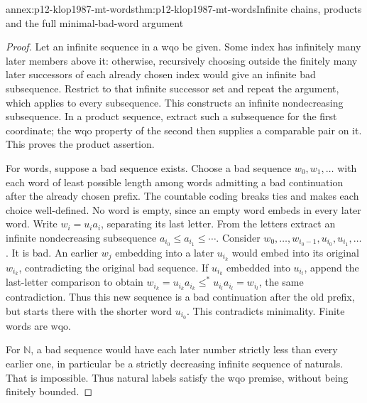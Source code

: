 \begin{annexitem}{annex:p12-klop1987-mt-words}{thm:p12-klop1987-mt-words}{Infinite chains, products and the full minimal-bad-word argument}
\begin{proof}
Let an infinite sequence in a wqo be given. Some index has infinitely
many later members above it: otherwise, recursively choosing outside
the finitely many later successors of each already chosen index would
give an infinite bad subsequence. Restrict to that infinite successor
set and repeat the argument, which applies to every subsequence.
This constructs an infinite nondecreasing subsequence. In a product
sequence, extract such a subsequence for the first coordinate; the
wqo property of the second then supplies a comparable pair on it.
This proves the product assertion.

For words, suppose a bad sequence exists. Choose a bad sequence
\(w_0,w_1,\ldots\) with each word of least possible length among
words admitting a bad continuation after the already chosen prefix.
The countable coding breaks ties and makes each choice well-defined.
No word is empty, since an empty word embeds in every later word.
Write \(w_i=u_i a_i\), separating its last letter. From the letters
extract an infinite nondecreasing subsequence
\(a_{i_0}\leq a_{i_1}\leq\cdots\).
Consider
\(w_0,\ldots,w_{i_0-1},u_{i_0},u_{i_1},\ldots\).
It is bad. An earlier \(w_j\) embedding into a later \(u_{i_k}\)
would embed into its original \(w_{i_k}\), contradicting the
original bad sequence. If \(u_{i_k}\) embedded into \(u_{i_l}\),
append the last-letter comparison to obtain
\(w_{i_k}=u_{i_k}a_{i_k}\leq^*u_{i_l}a_{i_l}=w_{i_l}\),
the same contradiction. Thus this new sequence is a bad continuation
after the old prefix, but starts there with the shorter word
\(u_{i_0}\). This contradicts minimality. Finite words are wqo.

For \(\mathbb N\), a bad sequence would have each later number
strictly less than every earlier one, in particular be a strictly
decreasing infinite sequence of naturals. That is impossible. Thus
natural labels satisfy the wqo premise, without being finitely bounded.
\end{proof}
\end{annexitem}

